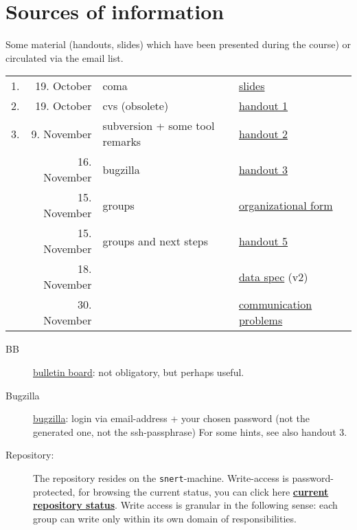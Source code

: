 
\section*{Sources of information}


Some material (handouts, slides) which have been presented during the
course) or circulated via the email list.



\begin{tabular}{r@{\quad\quad}rll}
  \hline
  1. & 19. October & coma  & 
  \href{slides/main-coma.pdf}{slides}
  \\
  2. & 19. October & cvs (obsolete) & \href{handouts/handout1.pdf}{handout 1}
  \\
  3. & 9. November & subversion + some tool remarks &
  \href{handouts/handout2.pdf}{handout 2}
  \\
   & 16. November & bugzilla &
  \href{handouts/handout3.pdf}{handout 3}
  \\
   & 15. November & groups &
  \href{handouts/handout4.pdf}{organizational form}
  \\
   & 15. November & groups and next steps &
  \href{handouts/handout5.pdf}{handout 5}
  \\\hline 
   & 18. November &  &
  \href{spec/v2/main.pdf}{data spec} (v2)
  \\\hline 
   & 30. November &  &
  \href{handouts/handout6.pdf}{communication problems}
  \\
\end{tabular}




\begin{description}
\item[BB]
  \href{http://snert.informatik.uni-kiel.de:8080/~swprakt/phpBB2/}{bulletin
    board}: not obligatory, but perhaps useful.
\item[Bugzilla] 
  \href{http://snert.informatik.uni-kiel.de:8080/~swprakt/bugzilla}{bugzilla}: 
  login via email-address + your chosen password (not the generated one, not the ssh-passphrase)
  For some hints, see also handout 3.
\item[Repository:] The repository resides on the \texttt{snert}-machine.
  Write-access is password-protected, for browsing the current status, you
  can click here
  \href{http://snert.informatik.uni-kiel.de:8080/svn/coma/}{\textbf{current
      repository status}}. Write access is granular in the following sense:
  each group can write only within its own domain of responsibilities.
\end{description}




